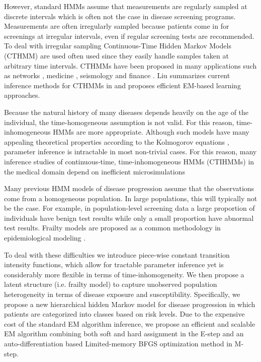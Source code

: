 \documentclass{article}
\begin{document}
However, standard HMMs assume that measurements are regularly sampled at discrete intervals which is often not the case in disease screening programs. Measurements are often irregularly sampled because patients come in for screenings at irregular intervals, even if regular screening tests are recommended.
To deal with irregular sampling Continuous-Time Hidden Markov Models (CTHMM) are used often used since they easily handle samples taken at arbitrary time intervals. CTHMMs have been proposed in many applications such as networks \cite{Wei_2002}, medicine \cite{Bureau_2003}, seismology \cite{Lu_2017} and finance \cite{Krishnamurthy_2016}.  Liu summarizes current inference methods for CTHMMs in \cite{Liu_2015} and proposes efficient EM-based learning approaches. 

Because the natural history of many diseases depends heavily on the age of the individual, the time-homogeneous assumption is not valid.  For this reason, time-inhomogeneous HMMs are more appropriate.  Although such models have many appealing theoretical properties according to the Kolmogorov equations \cite{Zeifman_1994}, parameter inference is intractable in most non-trivial cases. For this reason, many inference studies of continuous-time, time-inhomogeneous HMMs (CTIHMMs) in the medical domain depend on inefficient microsimulations \cite{Sonnernberg_1993,Myers_2000,Canfell_2004}

Many previous HMM models of disease progression assume that the observations come from a homogeneous population. In large populations, this will typically not be the case. For example, in population-level screening data a large proportion of individuals have benign test results while only a small proportion have abnormal test results. Frailty models are proposed as a common methodology in epidemiological modeling \citep{Amy2010}.

To deal with these difficulties we introduce piece-wise constant transition intensity functions, which allow for tractable parameter inference yet is considerably more flexible in terms of time-inhomogeneity.  We then propose a latent structure (i.e. frailty model) to capture unobserved population heterogeneity in terms of disease exposure and susceptibility.  Specifically, we propose a new hierarchical hidden Markov model for disease progression in which patients are categorized into classes based on risk levels. Due to the expensive cost of the standard EM algorithm inference, we propose an efficient and scalable EM algorithm combining both soft and hard assignment in the E-step and an auto-differentiation based Limited-memory BFGS optimization method in M-step. 
\end{document}
